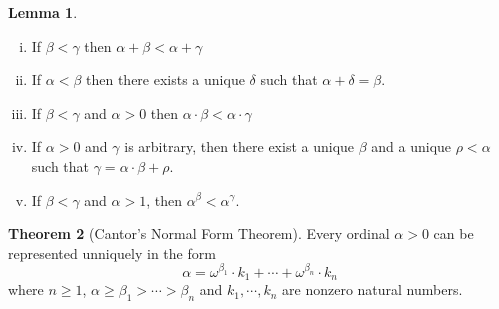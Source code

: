 \documentclass{article}
\theoremstyle{definition}
\newtheorem{thm}{Theorem}[section]
\newtheorem{lmma}[thm]{Lemma}
\begin{document}
\begin{lmma}
    \hfill
    \begin{enumerate}[(i)]
        \item If $\beta < \gamma$ then $\alpha + \beta < \alpha + \gamma$
        \item If $\alpha < \beta$ then there exists a unique $\delta$ such that $\alpha + \delta = \beta$.
        \item If $\beta < \gamma$ and $\alpha > 0$ then $\alpha \cdot \beta < \alpha \cdot \gamma$
        \item If $\alpha > 0$ and $\gamma$ is arbitrary, then there exist a unique $\beta$ and a unique $\rho < \alpha$ such that $\gamma = \alpha \cdot \beta + \rho$.
        \item If $\beta < \gamma$ and $\alpha > 1$, then $\alpha^\beta < \alpha^\gamma$.
    \end{enumerate}
\end{lmma}

\newpage

\begin{thm}[Cantor's Normal Form Theorem]
    Every ordinal $\alpha > 0$ can be represented unniquely in the form 
    \[
        \alpha = \omega^{\beta_1} \cdot k_1 + \cdots + \omega^{\beta_n} \cdot k_n    
    \]
    where $n \ge 1$, $\alpha \ge \beta_1 > \cdots > \beta_n$ and $k_1, \cdots, k_n$ are nonzero natural numbers. 
\end{thm}
\end{document}

